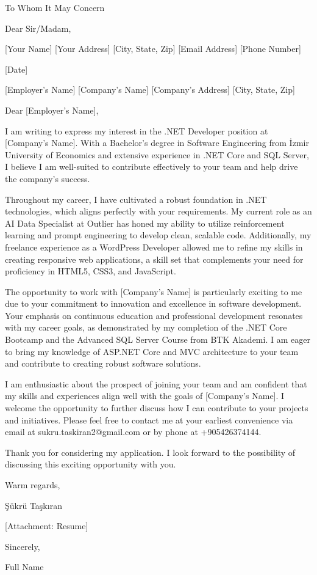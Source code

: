 \documentclass[11pt, a4paper]{letter}
\begin{document}
    
    \begin{letter}{To Whom It May Concern}
    
    \opening{Dear Sir/Madam,}
    
    [Your Name]  
[Your Address]  
[City, State, Zip]  
[Email Address]  
[Phone Number]  

[Date]  

[Employer's Name]  
[Company's Name]  
[Company's Address]  
[City, State, Zip]  

Dear [Employer's Name],

I am writing to express my interest in the .NET Developer position at [Company's Name]. With a Bachelor's degree in Software Engineering from İzmir University of Economics and extensive experience in .NET Core and SQL Server, I believe I am well-suited to contribute effectively to your team and help drive the company's success.

Throughout my career, I have cultivated a robust foundation in .NET technologies, which aligns perfectly with your requirements. My current role as an AI Data Specialist at Outlier has honed my ability to utilize reinforcement learning and prompt engineering to develop clean, scalable code. Additionally, my freelance experience as a WordPress Developer allowed me to refine my skills in creating responsive web applications, a skill set that complements your need for proficiency in HTML5, CSS3, and JavaScript.

The opportunity to work with [Company's Name] is particularly exciting to me due to your commitment to innovation and excellence in software development. Your emphasis on continuous education and professional development resonates with my career goals, as demonstrated by my completion of the .NET Core Bootcamp and the Advanced SQL Server Course from BTK Akademi. I am eager to bring my knowledge of ASP.NET Core and MVC architecture to your team and contribute to creating robust software solutions.

I am enthusiastic about the prospect of joining your team and am confident that my skills and experiences align well with the goals of [Company's Name]. I welcome the opportunity to further discuss how I can contribute to your projects and initiatives. Please feel free to contact me at your earliest convenience via email at sukru.taskiran2@gmail.com or by phone at +905426374144.

Thank you for considering my application. I look forward to the possibility of discussing this exciting opportunity with you.

Warm regards,

Şükrü Taşkıran

[Attachment: Resume]
    
    \closing{Sincerely,}
    
    \vspace{1cm}
    
    Full Name
    
    \end{letter}
    
    
\end{document}
